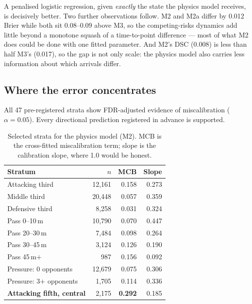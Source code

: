 \documentclass[11pt,a4paper]{article}
\begin{document}
A penalised logistic regression, given \emph{exactly} the state the physics model
receives, is decisively better. Two further observations follow. M2 and M2a
differ by 0.012 Brier while both sit 0.08--0.09 above M3, so the competing-risks
dynamics add little beyond a monotone squash of a time-to-point difference ---
most of what M2 does could be done with one fitted parameter. And M2's DSC
(0.008) is less than half M3's (0.017), so the gap is not only scale: the physics
model also carries less information about which arrivals differ.

\subsection{Where the error concentrates}

All 47 pre-registered strata show FDR-adjusted evidence of miscalibration
($\alpha = 0.05$). Every directional prediction registered in advance is
supported.

\begin{table}[h]
\centering
\small
\caption{Selected strata for the physics model (M2). MCB is the
cross-fitted miscalibration term; slope is the calibration slope, where 1.0 would
be honest.}
\label{tab:strata}
\begin{tabular}{lrrr}
\toprule
Stratum & $n$ & MCB & Slope \\
\midrule
Attacking third              & 12{,}161 & 0.158 & 0.273 \\
Middle third                 & 20{,}448 & 0.057 & 0.359 \\
Defensive third              & 8{,}258  & 0.031 & 0.324 \\
\addlinespace
Pass 0--10\,m                & 10{,}790 & 0.070 & 0.447 \\
Pass 20--30\,m               & 7{,}484  & 0.098 & 0.264 \\
Pass 30--45\,m               & 3{,}124  & 0.126 & 0.190 \\
Pass 45\,m$+$                & 987      & 0.156 & 0.092 \\
\addlinespace
Pressure: 0 opponents        & 12{,}679 & 0.075 & 0.306 \\
Pressure: 3$+$ opponents     & 1{,}705  & 0.114 & 0.336 \\
\addlinespace
\textbf{Attacking fifth, central} & 2{,}175 & \textbf{0.292} & 0.185 \\
\bottomrule
\end{tabular}
\end{table}
\end{document}

